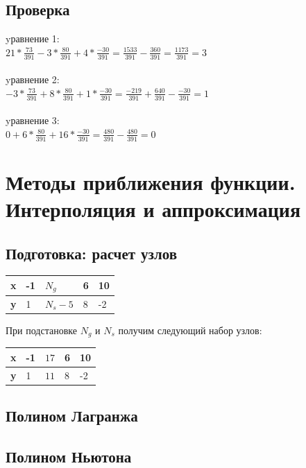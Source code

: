 \documentclass{article}
\begin{document}
\subsection{Проверка}
yравнение 1:\\
$21 * \frac{73}{391} -3*\frac{80}{391} + 4 * \frac{-30}{391}
= \frac{1533}{391} - \frac{360}{391}
= \frac{1173}{391} 
= 3$
\\\\
yравнение 2:\\
$ -3 * \frac{73}{391} + 8*\frac{80}{391} + 1 *\frac{-30}{391}
= \frac{-219}{391} + \frac{640}{391} - \frac{-30}{391}
= 1$
\\\\
yравнение 3:\\
$0 + 6*\frac{80}{391} + 16 *\frac{-30}{391}
= \frac{480}{391} -\frac{480}{391} 
= 0$

\section{Методы приближения функции. Интерполяция и аппроксимация}

\subsection{Подготовка: расчет узлов}
\begin{table}[!h]
  \begin{tabular}{|l|l|l|l|l|}
  \hline
  \bfseries x & -1 & $N_{g}$   & 6 & 10\\
  \hline
  \bfseries y &  1 & $N_{s}-5$ & 8 & -2\\
  \hline
  \end{tabular}
\end{table}
При подстановке $N_{g}$ и $N_{s}$ получим следующий набор узлов:
\begin{table}[!h]
  \begin{tabular}{|l|l|l|l|l|}
  \hline
  \bfseries x & -1 & $17$ & 6 & 10\\
  \hline
  \bfseries y &  1 & $11$ & 8 & -2\\
  \hline
  \end{tabular}
\end{table}
 
\subsection{Полином Лагранжа}
\subsection{Полином Ньютона}
\end{document}
